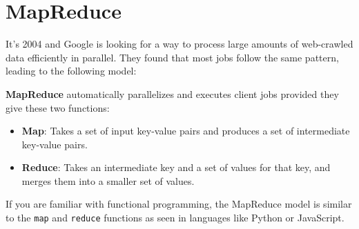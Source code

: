 \newpage
\section{MapReduce}
\label{sec:mapreduce}

\noindent
It's 2004 and Google is looking for a way to process large amounts of web-crawled data efficiently in parallel.
They found that most jobs follow the same pattern, leading to the following model:
\begin{Def}[MapReduce]

    \textbf{MapReduce} automatically parallelizes and executes client jobs provided they give these two functions:
    \begin{itemize}
        \item \textbf{Map}: Takes a set of input key-value pairs and produces a set of intermediate key-value pairs.
        \item \textbf{Reduce}: Takes an intermediate key and a set of values for that key, and merges them into a smaller set of values.
    \end{itemize}
\end{Def}

\begin{Note}
    If you are familiar with functional programming, the MapReduce model is similar to the \texttt{map} and \texttt{reduce} functions as seen in languages like Python or JavaScript.
\end{Note}

